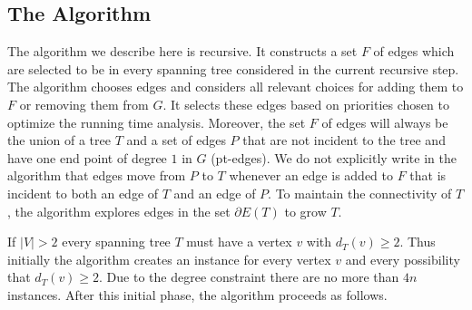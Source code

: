 \documentclass{llncs}
\begin{document}
\subsection{The Algorithm}

The algorithm we describe here is recursive. It constructs a set $F$ of edges which are selected to be in every spanning tree considered in the current recursive step. The algorithm chooses edges and considers all relevant choices for adding them to $F$ or removing them from $G$. It selects these edges based on priorities chosen to optimize the running time analysis. Moreover, the set $F$ of edges will always be the union of a tree $T$ and a set of edges $P$ that are not incident to the tree and have one end point of degree $1$ in $G$ (pt-edges). We do not explicitly write in the algorithm that edges move from $P$ to $T$ whenever an edge is added to $F$ that is incident to both an edge of $T$ and an edge of $P$. To maintain the connectivity of $T$, the algorithm explores edges in the set $\partial E(T)$ to grow $T$.

If $|V|>2$ every spanning tree $T$ must have a vertex $v$ with $d_T(v) \ge 2$. Thus initially the algorithm creates an instance for every vertex $v$ and every possibility that $d_T(v) \ge 2$. Due to the degree constraint there are no more than $4n$ instances. After this initial phase, the algorithm proceeds as follows.
\end{document}
